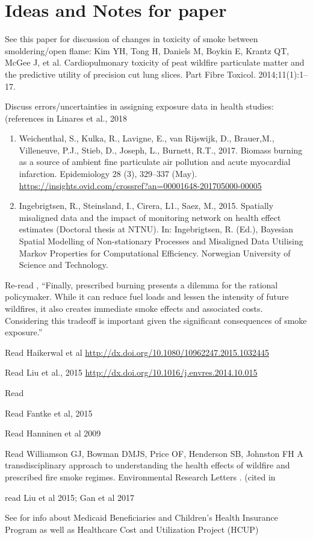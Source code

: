 \section{Ideas and Notes for paper}

See this paper for discussion of changes in toxicity of smoke between smoldering/open flame: Kim YH, Tong H, Daniels M, Boykin E, Krantz QT, McGee J, et al.
Cardiopulmonary toxicity of peat wildfire particulate matter and the predictive
utility of precision cut lung slices. Part Fibre Toxicol. 2014;11(1):1–17.

Discuss errors/uncertainties in assigning exposure data in health studies: (references in Linares et al., 2018 \cite{linares_impact_2018}
\begin{enumerate}
\item Weichenthal, S., Kulka, R., Lavigne, E., van Rijswijk, D., Brauer,M., Villeneuve, P.J., Stieb, D.,
Joseph, L., Burnett, R.T., 2017. Biomass burning as a source of ambient fine particulate
air pollution and acute myocardial infarction. Epidemiology 28 (3), 329–337 (May). \url{https://insights.ovid.com/crossref?an=00001648-201705000-00005}

\item Ingebrigtsen, R., Steinsland, I., Cirera, L1., Saez, M., 2015. Spatially misaligned data and the
impact of monitoring network on health effect estimates (Doctoral thesis at NTNU).
In: Ingebrigtsen, R. (Ed.), Bayesian Spatial Modelling of Non-stationary Processes
and Misaligned Data Utilising Markov Properties for Computational Efficiency. Norwegian
University of Science and Technology. 
\end{enumerate}

Re-read \cite{jones_application_2017}, ``Finally, prescribed burning presents a dilemma for the rational policymaker. While it can reduce fuel loads and lessen the intensity of future wildfires, it also creates immediate smoke effects and associated costs. Considering this tradeoff is important given the significant consequences of smoke exposure.''

Read Haikerwal et al \url{http://dx.doi.org/10.1080/10962247.2015.1032445}

Read Liu et al., 2015 \url{http://dx.doi.org/10.1016/j.envres.2014.10.015}

Read \cite{liu_wildfire-specific_2016}

Read Fantke et al, 2015 \cite{http://dx.doi.org/10.1007/s11367-014-0822-2}

Read Hanninen et al 2009 \cite{http://dx.doi.org/10.1038/jes.2008.31}

Read Williamson GJ, Bowman DMJS, Price OF, Henderson SB, Johnston FH \cite{williamson_transdisciplinary_2016} A transdisciplinary approach to understanding the health effects of wildfire and prescribed fire smoke regimes. Environmental Research Letters . (cited in \cite{hyde_air_2017}

read Liu et al 2015; Gan et al 2017

See \cite{vaidyanathan_developing_2018} for info about Medicaid Beneficiaries and Children's Health Insurance Program as well as Healthcare Cost and Utilization Project (HCUP)
